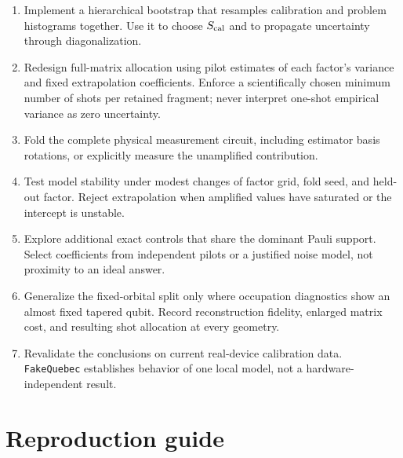 \documentclass[11pt]{article}
\newcommand{\code}[1]{\texttt{#1}}
\begin{document}
\begin{enumerate}
  \item Implement a hierarchical bootstrap that resamples calibration and
        problem histograms together.  Use it to choose $S_{\rm cal}$ and to
        propagate uncertainty through diagonalization.
  \item Redesign full-matrix allocation using pilot estimates of each
        factor's variance and fixed extrapolation coefficients.  Enforce a
        scientifically chosen minimum number of shots per retained fragment;
        never interpret one-shot empirical variance as zero uncertainty.
  \item Fold the complete physical measurement circuit, including estimator
        basis rotations, or explicitly measure the unamplified contribution.
  \item Test model stability under modest changes of factor grid, fold seed,
        and held-out factor.  Reject extrapolation when amplified values have
        saturated or the intercept is unstable.
  \item Explore additional exact controls that share the dominant Pauli
        support.  Select coefficients from independent pilots or a justified
        noise model, not proximity to an ideal answer.
  \item Generalize the fixed-orbital split only where occupation diagnostics
        show an almost fixed tapered qubit.  Record reconstruction fidelity,
        enlarged matrix cost, and resulting shot allocation at every geometry.
  \item Revalidate the conclusions on current real-device calibration data.
        \code{FakeQuebec} establishes behavior of one local model, not a
        hardware-independent result.
\end{enumerate}

\section{Reproduction guide}
\end{document}
